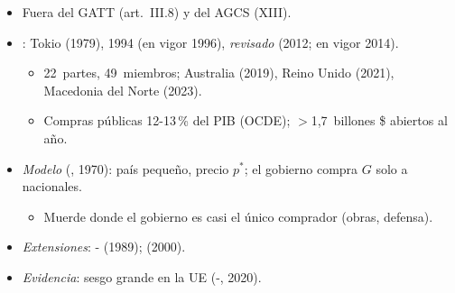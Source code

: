 \documentclass{article}
\begin{document}
\begin{columnas}
\begin{itemize}
\item Fuera del GATT (art.~III.8) y del AGCS (XIII).
\item {}: Tokio (1979), 1994 (en vigor 1996), \emph{revisado} (2012; en vigor 2014).
  \begin{itemize}
  \item 22~partes, 49~miembros; Australia (2019), Reino Unido (2021), Macedonia del Norte (2023).
  \item Compras públicas 12-13\,\% del PIB (OCDE); $>$1,7~billones \$ abiertos al año.
  \end{itemize}
\end{itemize}
\begin{itemize}
\item \emph{Modelo} (, 1970): país pequeño, precio $p^*$; el gobierno compra $G$ solo a nacionales.
  \begin{itemize}
  \item Muerde donde el gobierno es casi el único comprador (obras, defensa).
  \end{itemize}
\end{itemize}
\begin{itemize}
\item \emph{Extensiones}: - (1989);  (2000).
\item \emph{Evidencia}: sesgo grande en la UE (-, 2020).
\end{itemize}


\end{columnas}
\end{document}
